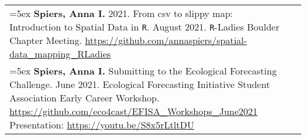 \begin{longtable}{@{} >{\raggedright}p{6.10in} >{\raggedleft}X @{}}

\hangindent=5ex \textbf{Spiers, Anna I.} 2021. From csv to slippy map: Introduction to Spatial Data in \texttt{R}. August 2021. \texttt{R}-Ladies Boulder Chapter Meeting. \url{https://github.com/annaspiers/spatial-data_mapping_RLadies} \tabularnewline

\hangindent=5ex \textbf{Spiers, Anna I.} Submitting to the Ecological Forecasting Challenge. June 2021. Ecological Forecasting Initiative Student Association Early Career Workshop. \url{https://github.com/eco4cast/EFISA_Workshops_June2021} \newline Presentation: \url{https://youtu.be/S8x5rLtltDU} \tabularnewline

\end{longtable}
